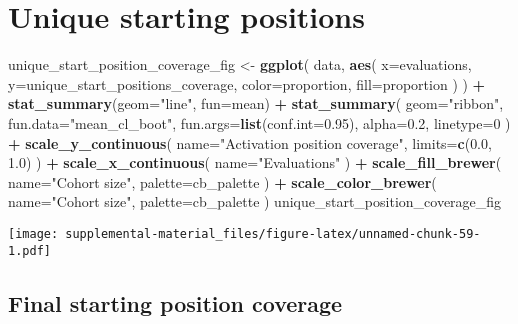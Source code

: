 \documentclass[]{book}
\newenvironment{Shaded}{\begin{snugshade}}{\end{snugshade}}
\newcommand{\DataTypeTok}[1]{\textcolor[rgb]{0.13,0.29,0.53}{#1}}
\newcommand{\DecValTok}[1]{\textcolor[rgb]{0.00,0.00,0.81}{#1}}
\newcommand{\FloatTok}[1]{\textcolor[rgb]{0.00,0.00,0.81}{#1}}
\newcommand{\KeywordTok}[1]{\textcolor[rgb]{0.13,0.29,0.53}{\textbf{#1}}}
\newcommand{\NormalTok}[1]{#1}
\newcommand{\OperatorTok}[1]{\textcolor[rgb]{0.81,0.36,0.00}{\textbf{#1}}}
\newcommand{\StringTok}[1]{\textcolor[rgb]{0.31,0.60,0.02}{#1}}
\begin{document}
\hypertarget{unique-starting-positions-5}{%
\section{Unique starting positions}\label{unique-starting-positions-5}}

\begin{Shaded}
\begin{Highlighting}[]
\NormalTok{unique_start_position_coverage_fig <-}\StringTok{ }\KeywordTok{ggplot}\NormalTok{(}
\NormalTok{    data,}
    \KeywordTok{aes}\NormalTok{(}
      \DataTypeTok{x=}\NormalTok{evaluations,}
      \DataTypeTok{y=}\NormalTok{unique_start_positions_coverage,}
      \DataTypeTok{color=}\NormalTok{proportion,}
      \DataTypeTok{fill=}\NormalTok{proportion}
\NormalTok{    )}
\NormalTok{  ) }\OperatorTok{+}
\StringTok{  }\KeywordTok{stat_summary}\NormalTok{(}\DataTypeTok{geom=}\StringTok{"line"}\NormalTok{, }\DataTypeTok{fun=}\NormalTok{mean) }\OperatorTok{+}
\StringTok{  }\KeywordTok{stat_summary}\NormalTok{(}
    \DataTypeTok{geom=}\StringTok{"ribbon"}\NormalTok{,}
    \DataTypeTok{fun.data=}\StringTok{"mean_cl_boot"}\NormalTok{,}
    \DataTypeTok{fun.args=}\KeywordTok{list}\NormalTok{(}\DataTypeTok{conf.int=}\FloatTok{0.95}\NormalTok{),}
    \DataTypeTok{alpha=}\FloatTok{0.2}\NormalTok{,}
    \DataTypeTok{linetype=}\DecValTok{0}
\NormalTok{  ) }\OperatorTok{+}
\StringTok{  }\KeywordTok{scale_y_continuous}\NormalTok{(}
    \DataTypeTok{name=}\StringTok{"Activation position coverage"}\NormalTok{,}
    \DataTypeTok{limits=}\KeywordTok{c}\NormalTok{(}\FloatTok{0.0}\NormalTok{, }\FloatTok{1.0}\NormalTok{)}
\NormalTok{  ) }\OperatorTok{+}
\StringTok{  }\KeywordTok{scale_x_continuous}\NormalTok{(}
    \DataTypeTok{name=}\StringTok{"Evaluations"}
\NormalTok{  ) }\OperatorTok{+}
\StringTok{  }\KeywordTok{scale_fill_brewer}\NormalTok{(}
    \DataTypeTok{name=}\StringTok{"Cohort size"}\NormalTok{,}
    \DataTypeTok{palette=}\NormalTok{cb_palette}
\NormalTok{  ) }\OperatorTok{+}
\StringTok{  }\KeywordTok{scale_color_brewer}\NormalTok{(}
    \DataTypeTok{name=}\StringTok{"Cohort size"}\NormalTok{,}
    \DataTypeTok{palette=}\NormalTok{cb_palette}
\NormalTok{  )}
\NormalTok{unique_start_position_coverage_fig}
\end{Highlighting}
\end{Shaded}

\texttt{[image: supplemental-material\_files/figure-latex/unnamed-chunk-59-1.pdf]}

\hypertarget{final-starting-position-coverage-4}{%
\subsection{Final starting position coverage}\label{final-starting-position-coverage-4}}
\end{document}
